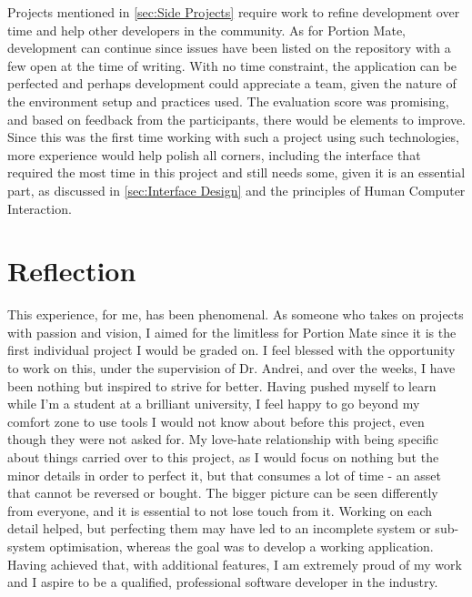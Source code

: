 \documentclass[../main.tex]{subfiles}
\begin{document}
Projects mentioned in \ref{sec:Side Projects} require work to refine development over time and help other developers in the community. As for Portion Mate, development can continue since issues have been listed on the repository with a few open at the time of writing. With no time constraint, the application can be perfected and perhaps development could appreciate a team, given the nature of the environment setup and practices used. The evaluation score was promising, and based on feedback from the participants, there would be elements to improve. Since this was the first time working with such a project using such technologies, more experience would help polish all corners, including the interface that required the most time in this project and still needs some, given it is an essential part, as discussed in \ref{sec:Interface Design} and the principles of Human Computer Interaction.

\section{Reflection}

This experience, for me, has been phenomenal. As someone who takes on projects with passion and vision, I aimed for the limitless for Portion Mate since it is the first individual project I would be graded on. I feel blessed with the opportunity to work on this, under the supervision of Dr. Andrei, and over the weeks, I have been nothing but inspired to strive for better. Having pushed myself to learn while I'm a student at a brilliant university, I feel happy to go beyond my comfort zone to use tools I would not know about before this project, even though they were not asked for. My love-hate relationship with being specific about things carried over to this project, as I would focus on nothing but the minor details in order to perfect it, but that consumes a lot of time - an asset that cannot be reversed or bought. The bigger picture can be seen differently from everyone, and it is essential to not lose touch from it. Working on each detail helped, but perfecting them may have led to an incomplete system or sub-system optimisation, whereas the goal was to develop a working application. Having achieved that, with additional features, I am extremely proud of my work and I aspire to be a qualified, professional software developer in the industry.
\end{document}

